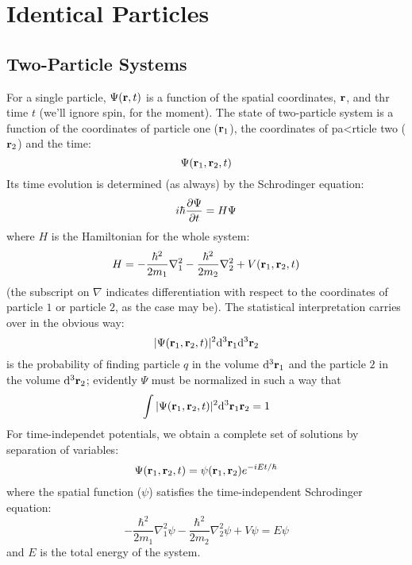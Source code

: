 \chapter{Identical Particles}
\section{Two-Particle Systems}
For a single particle, $\Psi(\vb{r},t)$ is a function of the spatial coordinates, $\vb{r}$, and thr time $t$ (we'll ignore spin, for the moment). The state of two-particle system is a function of the coordinates of particle one ($\vb{r}_1$), the coordinates of pa<rticle two ($\vb{r}_2$) and the time:
\begin{equation}\label{5.1}
	\Psi(\vb{r}_1,\vb{r}_2,t)
\end{equation}
Its time evolution is determined (as always) by the Schrodinger equation:
\begin{equation}\label{5.2}
	i\hbar\pdv{\Psi}{t}=H\Psi
\end{equation}
where $H$ is the Hamiltonian for the whole system:
\begin{equation}\label{5.3}
	H=-\frac{\hbar^2}{2m_1}\nabla_1^2-\frac{\hbar^2}{2m_2}\nabla_2^2+V(\vb{r}_1,\vb{r}_2,t)
\end{equation}
(the subscript on $\nabla$ indicates differentiation with respect to the coordinates of particle $1$ or particle $2$, as the case may be). The statistical interpretation carries over in the obvious way:
\begin{equation}\label{5.4}
	|\Psi(\vb{r}_1,\vb{r}_2,t)|^2\dd^3\vb{r}_1\dd^3\vb{r}_2
\end{equation}
is the probability of finding particle $q$ in the volume $\dd^3\vb{r}_1$ and the particle $2$ in the volume $\dd^3\vb{r}_2$; evidently $\Psi$ must be normalized in such a way that
\begin{equation}\label{5.5}
	\int|\Psi(\vb{r}_1,\vb{r}_2,t)|^2\dd^3\vb{r}_1\vb{r}_2=1
\end{equation}
For time-independet potentials, we obtain a complete set of solutions by separation of variables:
\begin{equation}\label{5.6}
	\Psi(\vb{r}_1,\vb{r}_2,t)=\psi(\vb{r}_1,\vb{r}_2)e^{-iEt/\hbar}
\end{equation}
where the spatial function ($\psi$) satisfies the time-independent Schrodinger equation:
\begin{equation}\label{5.7}
	-\frac{\hbar^2}{2m_1}\nabla_1^2\psi - \frac{\hbar^2}{2m_2}\nabla_2^2\psi+V\psi=E\psi
\end{equation}
and $E$ is the total energy of the system.






